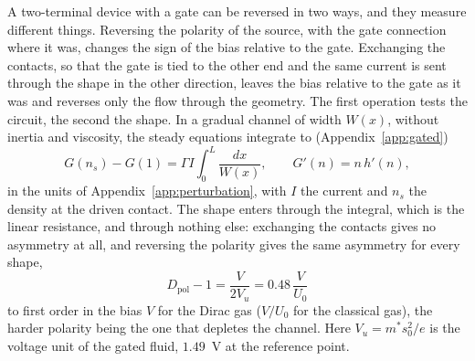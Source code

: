 A two-terminal device with a gate can be reversed in two ways, and they
measure different things. Reversing the polarity of the source, with the
gate connection where it was, changes the sign of the bias relative to the
gate. Exchanging the contacts, so that the gate is tied to the other end
and the same current is sent through the shape in the other direction,
leaves the bias relative to the gate as it was and reverses only the flow
through the geometry. The first operation tests the circuit, the second the
shape. In a gradual channel of width $W(x)$, without inertia and viscosity,
the steady equations integrate to (Appendix~\ref{app:gated})
\begin{equation}
G(n_{s})-G(1)=\Gamma I\int_{0}^{L}\frac{dx}{W(x)},\qquad
G'(n)=n\,h'(n),
\label{eq:1d}
\end{equation}
in the units of Appendix~\ref{app:perturbation}, with $I$ the current and
$n_{s}$ the density at the driven contact. The shape enters through the
integral, which is the linear resistance, and through nothing else:
exchanging the contacts gives no asymmetry at all, and reversing the
polarity gives the same asymmetry for every shape,
\begin{equation}
D_{\mathrm{pol}}-1=\frac{V}{2V_{u}}=0.48\,\frac{V}{U_{0}}
\label{eq:dpol}
\end{equation}
to first order in the bias $V$ for the Dirac gas ($V/U_{0}$ for the
classical gas), the harder polarity being the one that depletes the channel. Here
$V_{u}=m^{*}s_{0}^{2}/e$ is the voltage unit of the gated fluid, $1.49$~V
at the reference point.


